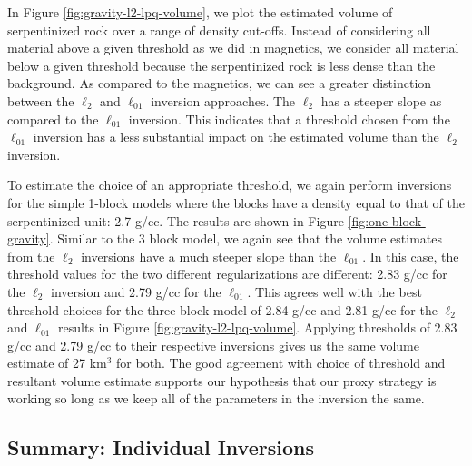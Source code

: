 \documentclass[
    paper,
  ]{geophysics}
\begin{document}


In Figure \ref{fig:gravity-l2-lpq-volume}, we plot the estimated volume of serpentinized rock over a range of density cut-offs. Instead of considering all material above a given threshold as we did in magnetics, we consider all material below a given threshold because the serpentinized rock is less dense than the background. As compared to the magnetics, we can see a greater distinction between the $\ell_2$ and $\ell_{01}$ inversion approaches. The $\ell_2$ has a steeper slope as compared to the $\ell_{01}$ inversion. This indicates that a threshold chosen from the $\ell_{01}$ inversion has a less substantial impact on the estimated volume than the $\ell_2$ inversion.



To estimate the choice of an appropriate threshold, we again perform inversions for the simple 1-block models where the blocks have a density equal to that of the serpentinized unit: 2.7 g/cc. The results are shown in Figure \ref{fig:one-block-gravity}. Similar to the 3 block model, we again see that the volume estimates from the $\ell_2$ inversions have a much steeper slope than the $\ell_{01}$. In this case, the threshold values for the two different regularizations are different:  2.83 g/cc for the $\ell_2$ inversion and 2.79 g/cc for the $\ell_{01}$. This agrees well with the best threshold choices for the three-block model of 2.84 g/cc and 2.81 g/cc for the $\ell_2$ and $\ell_{01}$ results in Figure \ref{fig:gravity-l2-lpq-volume}. Applying thresholds of 2.83 g/cc and 2.79 g/cc to their respective inversions gives us the same volume estimate of 27 km$^3$ for both. The good agreement with choice of threshold and resultant volume estimate supports our hypothesis that our proxy strategy is working so long as we keep all of the parameters in the inversion the same.








\subsection{Summary: Individual Inversions}
\end{document}
